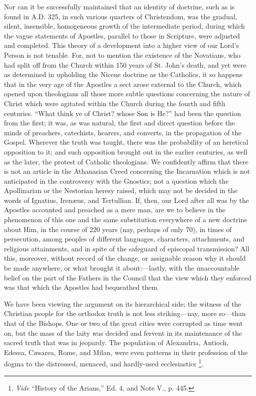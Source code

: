 Nor can it be successfully maintained that an
identity of doctrine, such as is found in A.D.
325, in such various quarters of Christendom, was the gradual, silent,
insensible, homogeneous growth of the intermediate period, during
which the vague statements of Apostles, parallel to those in
Scripture, were adjusted and completed. This theory of a development
into a higher view of our Lord's Person is not tenable. For, not to
mention the existence of the Novatians, who had split off from the
Church within 150 years of St. John's death, and yet were as
determined in upholding the Nicene doctrine as the Catholics, it so
happens that in the very age of the Apostles a sect arose external to
the Church, which opened upon theologians all those more subtle
questions concerning the nature of Christ which were agitated within
the Church during the fourth and fifth centuries. ``What think ye of
Christ? whose Son is He?'' had been the question from the first; it
was, as was natural, the first and direct question before the minds of
preachers, catechists, hearers, and converts, in the propagation of
the Gospel. Wherever the truth was taught, there was the probability
of an heretical opposition to it; and such opposition brought out in
the earlier centuries, as well as the later, the protest of
Catholic theologians. We confidently affirm that there is not an
article in the Athanasian Creed concerning the Incarnation which is
not anticipated in the controversy with the Gnostics; not a question
which the Apollinarian or the Nestorian heresy raised, which may not
be decided in the words of Ignatius, Irenæus, and Tertullian. If,
then, our Lord after all was by the Apostles accounted and preached as
a mere man, are we to believe in the phenomenon of this one and the
same substitution everywhere of a new doctrine about Him, in the
course of 220 years (nay, perhaps of only 70), in times of
persecution, among peoples of different languages, characters,
attachments, and religious attainments, and in spite of the safeguard
of episcopal transmission? All this, moreover, without record of the
change, or assignable reason why it should be made anywhere, or what
brought it about:—lastly, with the unaccountable belief on the part
of the Fathers in the Council that the view which they enforced was
that which the Apostles had bequeathed them.

We have been viewing the argument on its
hierarchical side; the witness of the Christian people for the
orthodox truth is not less striking—nay, more so—than that of the
Bishops. One or two of the great cities were corrupted as time went
on, but the mass of the laity was decided and fervent in its
maintenance of the sacred truth that was in jeopardy. The population
of Alexandria, Antioch, Edessa, Cæsarea, Rome, and Milan, were even
patterns in their profession of the dogma to the distressed, menaced,
and hardly-used ecclesiastics \footnote{\emph{Vide} ``History of the Arians,'' Ed. 4, and Note V., p.
445.}.


